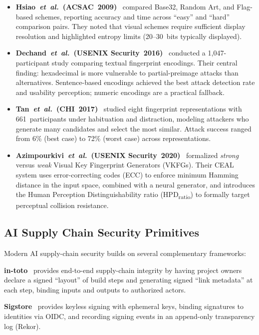 \documentclass[conference,10pt]{IEEEtran}
\newcommand{\etal}{\textit{et~al.}}
\begin{document}
\begin{itemize}[leftmargin=*,nosep]
  \item \textbf{Hsiao~\etal~(ACSAC~2009)}~\cite{hsiao2009study} compared Base32, Random Art, and Flag-based schemes, reporting accuracy and time across ``easy'' and ``hard'' comparison pairs. They noted that visual schemes require sufficient display resolution and highlighted entropy limits (20--30~bits typically displayed).
  \item \textbf{Dechand~\etal~(USENIX Security~2016)}~\cite{dechand2016empirical} conducted a 1,047-participant study comparing textual fingerprint encodings. Their central finding: hexadecimal is more vulnerable to partial-preimage attacks than alternatives. Sentence-based encodings achieved the best attack detection rate and usability perception; numeric encodings are a practical fallback.
  \item \textbf{Tan~\etal~(CHI~2017)}~\cite{tan2017unicorns} studied eight fingerprint representations with 661~participants under habituation and distraction, modeling attackers who generate many candidates and select the most similar. Attack success ranged from 6\% (best case) to 72\% (worst case) across representations.
  \item \textbf{Azimpourkivi~\etal~(USENIX Security~2020)}~\cite{azimpourkivi2020human} formalized \emph{strong} versus \emph{weak} Visual Key Fingerprint Generators (VKFGs). Their CEAL system uses error-correcting codes (ECC) to enforce minimum Hamming distance in the input space, combined with a neural generator, and introduces the Human Perception Distinguishability ratio (HPD\textsubscript{ratio}) to formally target perceptual collision resistance.
\end{itemize}

\subsection{AI Supply Chain Security Primitives}
\label{sec:bg:supplychain}

Modern AI supply-chain security builds on several complementary frameworks:

\noindent\textbf{in-toto}~\cite{torres2019intoto} provides end-to-end supply-chain integrity by having project owners declare a signed ``layout'' of build steps and generating signed ``link metadata'' at each step, binding inputs and outputs to authorized actors.

\noindent\textbf{Sigstore}~\cite{sigstore2024docs} provides keyless signing with ephemeral keys, binding signatures to identities via OIDC, and recording signing events in an append-only transparency log (Rekor).
\end{document}

